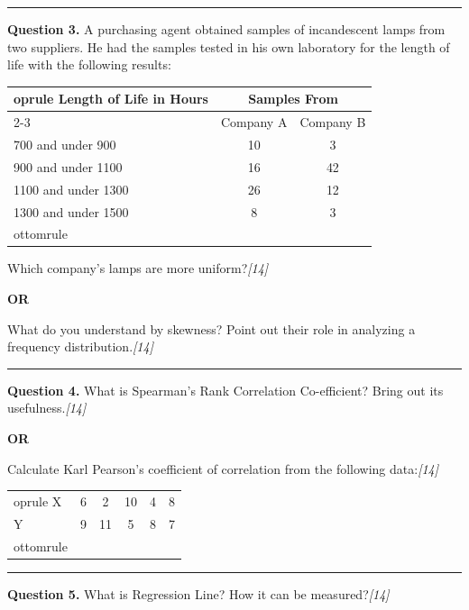 \documentclass[11pt,a4paper]{article}
\newcommand{\pts}[1]{\hfill   \textit{[#1]}}
\begin{document}
\medskip\rule{\linewidth}{0.2pt}




\noindent   \textbf{Question 3.}
A purchasing agent obtained samples of incandescent lamps from two suppliers. He had the samples tested in his own laboratory for the length of life with the following results:

\begin{center}
  
\begin{tabular}{lcc}
     oprule
    Length of Life in Hours & \multicolumn{2}{c}{Samples From} \\
    \cmidrule{2-3}
    & Company A & Company B \\
    \midrule
    700 and under 900 & 10 & 3 \\
    900 and under 1100 & 16 & 42 \\
    1100 and under 1300 & 26 & 12 \\
    1300 and under 1500 & 8 & 3 \\
    ottomrule
  \end{tabular}
\end{center}
Which company's lamps are more uniform?\pts{14}

\centerline{   \textbf{OR}}

What do you understand by skewness? Point out their role in analyzing a frequency distribution.\pts{14}

\medskip\rule{\linewidth}{0.2pt}




\noindent   \textbf{Question 4.}
What is Spearman's Rank Correlation Co-efficient? Bring out its usefulness.\pts{14}

\centerline{   \textbf{OR}}

Calculate Karl Pearson's coefficient of correlation from the following data:\pts{14}

\begin{center}
  
\begin{tabular}{lccccc}
     oprule
    X & 6 & 2 & 10 & 4 & 8 \\
    Y & 9 & 11 & 5 & 8 & 7 \\
    ottomrule
  \end{tabular}
\end{center}

\medskip\rule{\linewidth}{0.2pt}




\noindent   \textbf{Question 5.}
What is Regression Line? How it can be measured?\pts{14}
\end{document}
